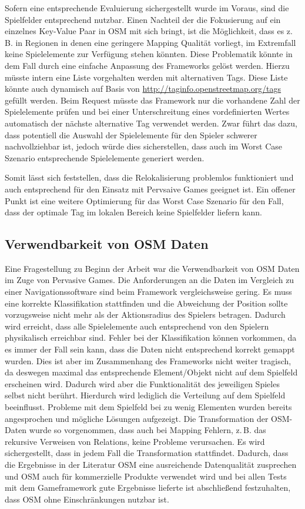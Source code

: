 Sofern eine entsprechende Evaluierung sichergestellt wurde im Voraus, sind die Spielfelder entsprechend nutzbar.
Einen Nachteil der die Fokusierung auf ein einzelnes Key-Value Paar in OSM mit sich bringt, ist die Möglichkeit, dass es z.\,B. in Regionen in denen eine geringere Mapping Qualität vorliegt, im Extremfall keine Spielelemente zur Verfügung stehen könnten. Diese Problematik könnte in dem Fall durch eine einfache Anpassung des Frameworks gelöst werden. Hierzu müsste intern eine Liste vorgehalten werden mit alternativen Tags. Diese Liste könnte auch dynamisch auf Basis von \url{http://taginfo.openstreetmap.org/tags} gefüllt werden. Beim Request müsste das Framework nur die vorhandene Zahl der Spielelemente prüfen und bei einer Unterschreitung eines vordefinierten Wertes automatisch der nächste alternative Tag verwendet werden. Zwar führt das dazu, dass potentiell die Auswahl der Spielelemente für den Spieler schwerer nachvollziehbar ist, jedoch würde dies sicherstellen, dass auch im Worst Case Szenario entsprechende Spielelemente generiert werden.

Somit lässt sich feststellen, dass die Relokalisierung problemlos funktioniert und auch entsprechend für den Einsatz mit Pervsaive Games geeignet ist. Ein offener Punkt ist eine weitere Optimierung für das Worst Case Szenario für den Fall, dass der optimale Tag im lokalen Bereich keine Spielfelder liefern kann.

\subsection*{Verwendbarkeit von OSM Daten}

Eine Fragestellung zu Beginn der Arbeit war die Verwendbarkeit von OSM Daten im Zuge von Pervasive Games.
Die Anforderungen an die Daten im Vergleich zu einer Navigationssoftware sind beim Framework vergleichsweise gering.
Es muss eine korrekte Klassifikation stattfinden und die Abweichung der Position sollte vorzugsweise nicht mehr als der Aktionsradius des Spielers betragen. Dadurch wird erreicht, dass alle Spielelemente auch entsprechend von den Spielern physikalisch erreichbar sind.
Fehler bei der Klassifikation können vorkommen, da es immer der Fall sein kann, dass die Daten nicht entsprechend korrekt gemappt wurden.
Dies ist aber im Zusammenhang des Frameworks nicht weiter tragisch, da deswegen maximal das entsprechende Element/Objekt nicht auf dem Spielfeld erscheinen wird. Dadurch wird aber die Funktionalität des jeweiligen Spieles selbst nicht berührt. Hierdurch wird lediglich die Verteilung auf dem Spielfeld beeinflusst. Probleme mit dem Spielfeld bei zu wenig Elementen wurden bereits angesprochen und mögliche Lösungen aufgezeigt.
Die Transformation der OSM-Daten wurde so vorgenommen, dass auch bei Mapping Fehlern, z.\,B. das rekursive Verweisen von Relations, keine Probleme verursachen. Es wird sichergestellt, dass in jedem Fall die Transformation stattfindet.
Dadurch, dass die Ergebnisse in der Literatur OSM eine ausreichende Datenqualität zusprechen und OSM auch für kommerzielle Produkte verwendet wird und bei allen Tests mit dem Gameframework gute Ergebnisse lieferte ist abschließend festzuhalten, dass OSM ohne Einschränkungen nutzbar ist.

